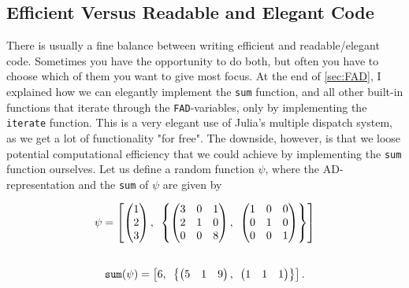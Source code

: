 \subsection{Efficient Versus Readable and Elegant Code}
There is usually a fine balance between writing efficient and readable/elegant code. Sometimes you have the opportunity to do both, but often you have to choose which of them you want to give most focus. At the end of \autoref{sec:FAD}, I explained how we can elegantly implement the \texttt{sum} function, and all other built-in functions that iterate through the \texttt{FAD}-variables, only by implementing the \texttt{iterate} function. This is a very elegant use of Julia's multiple dispatch system, as we get a lot of functionality "for free". The downside, however, is that we loose potential computational efficiency that we could achieve by implementing the \texttt{sum} function ourselves. Let us define a random function $\psi$, where the AD-representation and the \texttt{sum} of $\psi$ are given by
\begin{multicols}{2}
    \noindent
    \begin{align*}
        \textbf{$\psi$} = \left[\begin{pmatrix}1\\2\\3
        \end{pmatrix},\hspace{0.5em}\left\{
        \begin{pmatrix}
        3&0&1\\
        2&1&0\\
        0&0&8\end{pmatrix},\hspace{0.5em}
        \begin{pmatrix}
        1&0&0\\
        0&1&0\\
        0&0&1\end{pmatrix}\right\}
        \right]
    \end{align*}
    \begin{align*}
    \\
        \texttt{sum}(\textbf{$\psi$}) = \left[6,\hspace{0.5em}
        \left\{
        \begin{pmatrix}
        5&1&9\\
        \end{pmatrix},\hspace{0.5em}
        \begin{pmatrix}
        1&1&1\\
        \end{pmatrix}\right\}
        \right].
    \end{align*}
\end{multicols}
